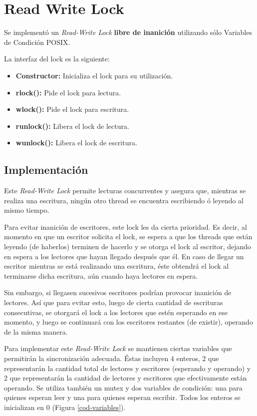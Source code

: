 \section{Read Write Lock}

Se implementó un {\it Read-Write Lock} {\bf libre de inanición} utilizando sólo Variables de Condición POSIX. 

La interfaz del lock es la siguiente:

\begin{itemize}
\item {\bf Constructor:} Inicializa el lock para su utilización.
\item {\bf rlock():} Pide el lock para lectura.
\item {\bf wlock():} Pide el lock para escritura.
\item {\bf runlock():} Libera el lock de lectura.
\item {\bf wunlock():} Libera el lock de escritura.
\end{itemize}

\subsection{Implementación}

Este {\it Read-Write Lock} permite lecturas concurrentes y asegura que, mientras se realiza una escritura, ningún otro thread se encuentra escribiendo ó leyendo al mismo tiempo.

Para evitar inanición de escritores, este lock les da cierta prioridad. Es decir, al momento en que un escritor solicita el lock, se espera a que los threads que están leyendo (de haberlos) terminen de hacerlo y se otorga el lock al escritor, dejando en espera a los lectores que hayan llegado después que él. En caso de llegar un escritor mientras se está realizando una escritura, éste obtendrá el lock al terminarse dicha escritura, aún cuando haya lectores en espera.

Sin embargo, si llegasen sucesivos escritores podrían provocar inanición de lectores.  Así que para evitar esto, luego de cierta cantidad de escrituras consecutivas, se otorgará el lock a los lectores que estén esperando en ese momento, y luego se continuará con los escritores restantes (de existir), operando de la misma manera.

Para implementar este {\it Read-Write Lock} se mantienen ciertas variables que permitirán la sincronización adecuada. Éstas incluyen 4 enteros, 2 que representarán la cantidad total de lectores y escritores (esperando y operando) y 2 que representarán la cantidad de lectores y escritores que efectivamente están operando.  Se utiliza también un mutex y dos variables de condición: una para quienes esperan leer y una para quienes esperan escribir.  Todos los enteros se inicializan en 0 (Figura \ref{cod-variables}).


